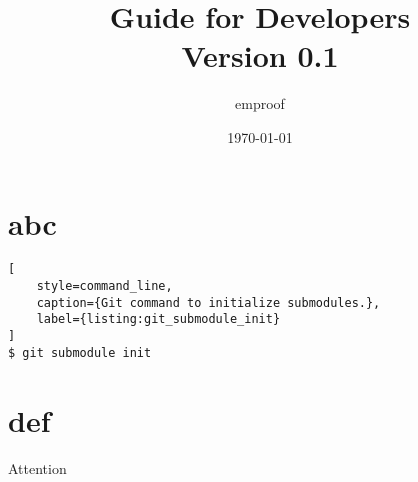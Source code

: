 \documentclass[a4paper, 10pt]{scrartcl}
\author{emproof}
\title{Guide for Developers \\ {\textnormal{\large Version 0.1}}}
\date{\today}
\begin{document}
\maketitle 

\section{abc}
\blindtext
\blindtext
\blindtext

\begin{lstlisting}[
	style=command_line,
	caption={Git command to initialize submodules.},
	label={listing:git_submodule_init}
]
$ git submodule init
\end{lstlisting}


\pagebreak

\section{def}
\blindtext

\begin{warningbox}
	{\Large {}}\noindent Attention
\end{warningbox}
\end{document}
